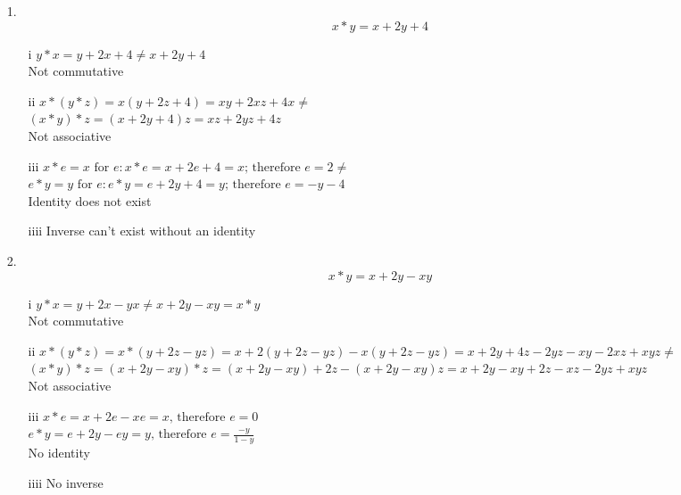 \begin{enumerate}

\item[1.]
\begin{equation}
x*y=x+2y+4
\end{equation}

\begin{enumerate}

\item[i]
$y * x = y + 2x + 4 \neq x + 2y + 4$ \\
Not commutative

\item[ii]
$x*(y*z)=x(y+2z+4)=xy+2xz+4x \neq$ \\
$(x*y)*z=(x+2y+4)z=xz+2yz+4z$ \\
Not associative

\item[iii]
$x*e=x \text{ for } e: x*e=x+2e+4=x \text{; therefore } e=2 \neq$ \\
$e*y=y \text{ for } e: e*y=e+2y+4=y \text{; therefore } e=-y-4$ \\
Identity does not exist

\item[iiii]
Inverse can't exist without an identity

\end{enumerate}

\item[2.]
\begin{equation}
x*y=x+2y-xy
\end{equation}

\begin{enumerate}

\item[i]
$y*x=y+2x-yx \neq x+2y-xy=x*y$ \\
Not commutative

\item[ii]
$x*(y*z)=x*(y+2z-yz)=x+2(y+2z-yz)-x(y+2z-yz)=x+2y+4z-2yz-xy-2xz+xyz \neq$ \\
$(x*y)*z=(x+2y-xy)*z=(x+2y-xy)+2z-(x+2y-xy)z=x+2y-xy+2z-xz-2yz+xyz$ \\
Not associative

\item[iii]
$x*e=x+2e-xe=x \text{, therefore } e=0$ \\
$e*y=e+2y-ey=y \text{, therefore } e=\frac{-y}{1-y}$ \\
No identity

\item[iiii]
No inverse


\end{enumerate}
\end{enumerate}
